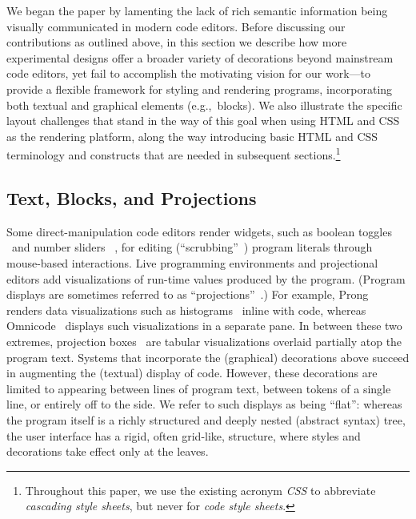\documentclass[acmsmall, screen]{acmart}
\newcommand{\inlineFig}[1]{\begingroup\normalfont
\raisebox{-0.01in}{\texttt{[image: \#1]}}
  \endgroup
}
\begin{document}
We began the paper by lamenting the lack of rich semantic information being visually communicated in modern code editors.
Before discussing our contributions as outlined above, in this section
we describe how more experimental designs offer a broader variety of decorations beyond mainstream code editors, yet fail to accomplish the motivating vision for our work---to provide a flexible framework for styling and rendering programs, incorporating both textual and graphical elements (e.g.,~blocks).
We also illustrate the specific layout challenges that stand in the way of this goal when using HTML and CSS as the rendering platform, along the way introducing basic HTML and CSS terminology and constructs that are needed in subsequent sections.\footnote{Throughout this paper, we use the existing acronym \emph{CSS} to abbreviate \emph{cascading style sheets}, but never for \emph{code style sheets}.}



\subsection{Text, Blocks, and Projections} 



Some direct-manipulation code editors render widgets, such as boolean toggles~\inlineFig{images/editor-checkbox}~and number sliders~\inlineFig{images/editor-number-slider}, for editing (``scrubbing''~\cite{ScrubbingCalculator, CSSTricksNumberScrubbing}) program literals through mouse-based interactions.
Live programming environments and projectional editors add visualizations of run-time values produced by the program.
(Program displays are sometimes referred to as ``projections''~\cite{Fowler08Projectional}.)
For example, Prong~\cite{Prong} renders data visualizations such as histograms~\inlineFig{images/editor-histogram} inline with code, whereas Omnicode~\cite{Omnicode} displays such visualizations in a separate pane.
In between these two extremes, projection boxes~\cite{Lerner2020} are tabular visualizations overlaid partially atop the program text.
Systems that incorporate the (graphical) decorations above succeed in augmenting the (textual) display of code.
However, these decorations are limited to appearing between lines of program text, between tokens of a single line, or entirely off to the side.
We refer to such displays as being ``flat'': whereas the program itself is a richly structured and deeply nested (abstract syntax) tree, the user interface has a rigid, often grid-like, structure, where styles and decorations take effect only at the leaves.
\end{document}
